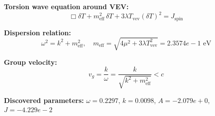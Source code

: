 
\textbf{Torsion wave equation around VEV:}
\begin{equation}
  \Box \delta T + m_{\text{eff}}^2 \, \delta T + 3\lambda T_{\text{vev}} (\delta T)^2 = J_{\text{spin}}
\end{equation}

\textbf{Dispersion relation:}
\begin{equation}
  \omega^2 = k^2 + m_{\text{eff}}^2, \quad
  m_{\text{eff}} = \sqrt{4\mu^2 + 3\lambda T_{\text{vev}}^2} = 2.3574e-1 \text{ eV}
\end{equation}

\textbf{Group velocity:}
\begin{equation}
  v_g = \frac{k}{\omega} = \frac{k}{\sqrt{k^2 + m_{\text{eff}}^2}} < c
\end{equation}

\textbf{Discovered parameters:}
$\omega = 0.2297$, \quad
$k = 0.0098$, \quad
$A = -2.079e+0$, \quad
$J = -4.229e-2$